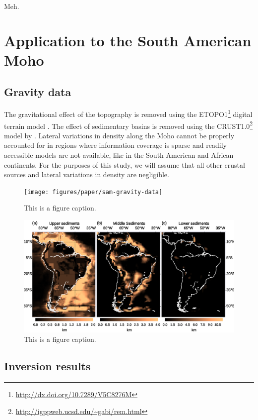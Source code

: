 \documentclass[extra,mreferee]{gji}
\begin{document}
Meh.


\section{Application to the South American Moho}


\subsection{Gravity data}

The gravitational effect of the topography
is removed using the
ETOPO1\footnote{\url{http://dx.doi.org/10.7289/V5C8276M}}
digital terrain model
\citep{amante2009}.
The effect of sedimentary basins is removed using the
CRUST1.0\footnote{\url{http://igppweb.ucsd.edu/~gabi/rem.html}} model
by
\citet{laske2013}.
Lateral variations in density along the Moho cannot be properly accounted for
in regions where information coverage is sparse and readily accessible models
are not available, like in the South American and African continents.
For the purposes of this study, we will assume that all other crustal sources
and lateral variations in density are negligible.


\begin{figure}
    \centering
    \texttt{[image: figures/paper/sam-gravity-data]}
    \caption{This is a figure caption.}
    \label{fig:sam-data}
\end{figure}

\begin{figure}
    \centering
    \includegraphics[width=\textwidth]{figures/paper/sam-gravity-sed}
    \caption{This is a figure caption.}
    \label{fig:sam-sed}
\end{figure}


\subsection{Inversion results}
\end{document}
